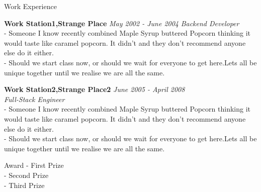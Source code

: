 \documentclass{resume} %
\begin{document}
\begin{rSection}{Work Experience}

{\bf Work Station1,Strange Place } \hfill {\em May 2002 - June 2004} 
{\textit{Backend Developer}}\\
- Someone I know recently combined Maple Syrup  buttered Popcorn thinking it would taste like caramel popcorn. It didn’t and they don’t recommend anyone else do it either.
\\- Should we start class now, or should we wait for everyone to get here.Lets all be unique together until we realise we are all the same.

{\bf Work Station2,Strange Place2} \hfill {\em June 2005 - April 2008} 
\\{\textit{Full-Stack Engineer}}
\\- Someone I know recently combined Maple Syrup buttered Popcorn thinking it would taste like caramel popcorn. It didn’t and they don’t recommend anyone else do it either.
\\- Should we start class now, or should we wait for everyone to get here.Lets all be unique together until we realise we are all the same.




\end{rSection}
\begin{rSection}{Award}
- First Prize\\
- Second Prize\\
- Third Prize\\
\end{rSection}


\end{document}
